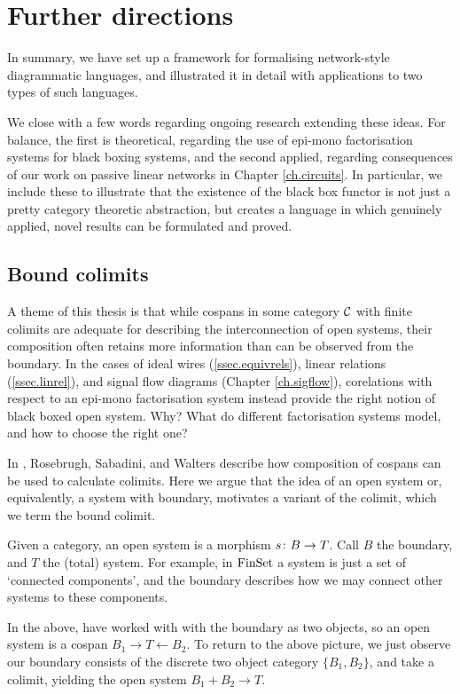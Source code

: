 \chapter{Further directions} \label{ch.further}
In summary, we have set up a framework for formalising network-style
diagrammatic languages, and illustrated it in detail with applications to two
types of such languages.

We close with a few words regarding ongoing research extending these ideas. For
balance, the first is theoretical, regarding the use of epi-mono factorisation
systems for black boxing systems, and the second applied, regarding consequences
of our work on passive linear networks in Chapter \ref{ch.circuits}. In
particular, we include these to illustrate that the existence of the black
box functor is not just a pretty category theoretic abstraction, but creates a
language in which genuinely applied, novel results can be formulated and proved.

\section{Bound colimits}

A theme of this thesis is that while cospans in some category $\mathcal C$ with
finite colimits are adequate for describing the interconnection of open systems,
their composition often retains more information than can be observed from the
boundary. In the cases of ideal wires (\textsection\ref{ssec.equivrels}), linear
relations (\textsection\ref{ssec.linrel}), and signal flow diagrams (Chapter
\ref{ch.sigflow}), corelations with respect to an epi-mono factorisation system
instead provide the right notion of black boxed open system. Why? What do
different factorisation systems model, and how to choose the right one?

In \cite{RSW08}, Rosebrugh, Sabadini, and Walters describe how composition of
\linebreak
cospans can be used to calculate colimits. Here we argue that the idea of an
open system or, equivalently, a system with boundary, motivates a variant of
the colimit, which we term the bound colimit.

Given a category, an open system is a morphism $s{\colon} B \to T$. Call $B$ the
boundary, and $T$ the (total) system. For example, in $\mathrm{FinSet}$ a system is just
a set of `connected components', and the boundary describes how we may connect
other systems to these components.

In the above, have worked with with the boundary as two objects, so an open
system is a cospan $B_1 \to T \leftarrow B_2$. To return to the above picture,
we just observe our boundary consists of the discrete two object category
$\{B_1,B_2\}$, and take a colimit, yielding the open system $B_1+B_2 \to T$.

